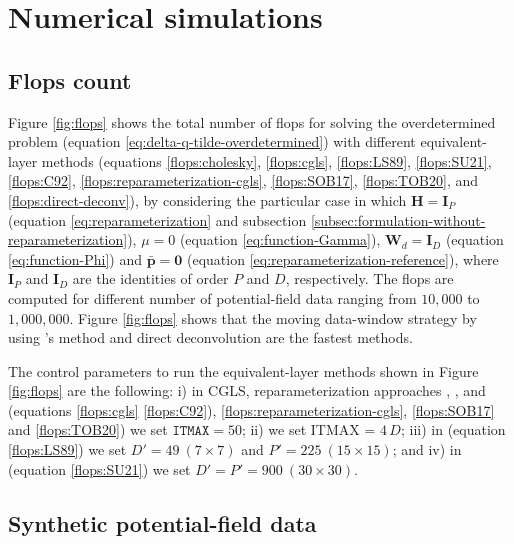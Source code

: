 \section{Numerical simulations}
\label{sec:numerical-simulations}

\subsection{Flops count}
\label{subsec:flops-count}

Figure \ref{fig:flops} shows the total number of flops for solving the overdetermined problem
(equation \ref{eq:delta-q-tilde-overdetermined}) with different equivalent-layer methods
(equations \ref{flops:cholesky}, \ref{flops:cgls}, \ref{flops:LS89}, \ref{flops:SU21}, 
\ref{flops:C92}, \ref{flops:reparameterization-cgls}, \ref{flops:SOB17}, \ref{flops:TOB20},
and \ref{flops:direct-deconv}), by considering 
the particular case in which $\mathbf{H} = \mathbf{I}_{P}$ (equation \ref{eq:reparameterization} and 
subsection \ref{subsec:formulation-without-reparameterization}),
$\mu = 0$ (equation \ref{eq:function-Gamma}), 
$\mathbf{W}_{d} = \mathbf{I}_{D}$ (equation \ref{eq:function-Phi}) and
$\bar{\mathbf{p}} = \mathbf{0}$ (equation \ref{eq:reparameterization-reference}), 
where $\mathbf{I}_{P}$ and $\mathbf{I}_{D}$ are the identities of order $P$ and $D$, respectively.
The flops are computed for different number of potential-field data ranging from $10,000$ to $1,000,000$.
Figure \ref{fig:flops} shows that the moving data-window strategy by using 
\citeauthor{leao-silva1989}'s \citeyear{leao-silva1989} method and direct deconvolution are the fastest methods.

The control parameters to run the equivalent-layer methods shown in Figure 
 \ref{fig:flops}  are the following: 
i) in CGLS, 
reparameterization approaches \cite[e.g.,][]{oliveirajr-etal2013, mendonca2020}, 
\cite{siqueira-etal2017}, and 
\cite{takahashi-etal2020}
(equations \ref{flops:cgls} \ref{flops:C92}), 
\ref{flops:reparameterization-cgls},  \ref{flops:SOB17} and \ref{flops:TOB20}) we set $\mathtt{ITMAX} = 50$; 
ii) \cite{cordell1992} we set ITMAX = $4 \, D$;
iii) in \cite{leao-silva1989} (equation \ref{flops:LS89}) we set 
$D'= 49 \: (7 \times 7)$ and $P' = 225 \: (15 \times 15) $; and
iv) in \cite{soler-uieda2021} (equation  \ref{flops:SU21}) we set 
$D'= P' = 900 \: (30 \times 30)$.

\subsection{Synthetic potential-field data}
\label{subsec:synthetic-data}

